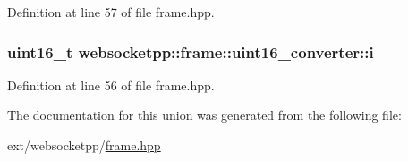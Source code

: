 Definition at line 57 of file frame.\+hpp.

\hypertarget{unionwebsocketpp_1_1frame_1_1uint16__converter_af60efc5747260bafeb6cd2b8ab267e2d}{}
\subsubsection[{i}]{\setlength{\rightskip}{0pt plus 5cm}uint16\+\_\+t websocketpp\+::frame\+::uint16\+\_\+converter\+::i}\label{unionwebsocketpp_1_1frame_1_1uint16__converter_af60efc5747260bafeb6cd2b8ab267e2d}


Definition at line 56 of file frame.\+hpp.



The documentation for this union was generated from the following file\+:\begin{DoxyCompactItemize}
\item 
ext/websocketpp/\hyperlink{frame_8hpp}{frame.\+hpp}\end{DoxyCompactItemize}
